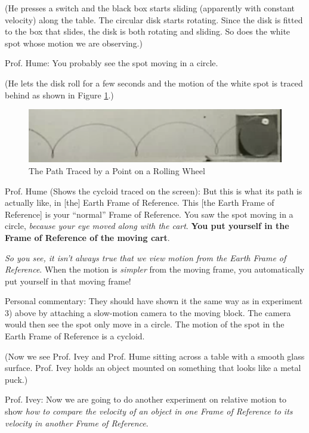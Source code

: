 \documentclass[a6paper]{article}
\newcommand{\perscom}[1]{
    {\footnotesize Personal commentary:  #1}
}
\begin{document}
(He presses a switch and the black box starts sliding (apparently with constant velocity) along the table. The circular disk starts rotating. Since the disk is fitted to the box that slides, the disk is both rotating and sliding. So does the white spot whose motion we are observing.)

Prof. Hume: You probably see the spot moving in a circle. 

(He lets the disk roll for a few seconds and the motion of the white spot is traced behind as shown in Figure \ref{fig: prof-hume-cycloid-2}.)
        \begin{figure}[h!]
            \centering
            \includegraphics[width=0.7\linewidth]{prof-hume-cycloid-2.png}
            \caption{The Path Traced by a Point on a Rolling Wheel}
            \label{fig: prof-hume-cycloid-2}
        \end{figure}

Prof. Hume (Shows the cycloid traced on the screen): But this is what its path is actually like, in [the] Earth Frame of Reference. This [the Earth Frame of Reference] is your ``normal'' Frame of Reference. You saw the spot moving in a circle, \emph{because your eye moved along with the cart}. \textbf{You put yourself in the Frame of Reference of the moving cart}. 

\emph{So you see, it isn't always true that we view motion from the Earth Frame of Reference}. When the motion is \emph{simpler} from the moving frame, you automatically put yourself in that moving frame! 

\perscom{ They should have shown it the same way as in experiment 3) above by attaching a slow-motion camera to the moving block. The camera would then see the spot only move in a circle. The motion of the spot in the Earth Frame of Reference is a cycloid. }

(Now we see Prof. Ivey and Prof. Hume sitting across a table with a smooth glass surface. Prof. Ivey holds an object mounted on something that looks like a metal puck.)

Prof. Ivey: Now we are going to do another experiment on relative motion to show \emph{how to compare the velocity of an object in one Frame of Reference to its velocity in another Frame of Reference}.
\end{document}
